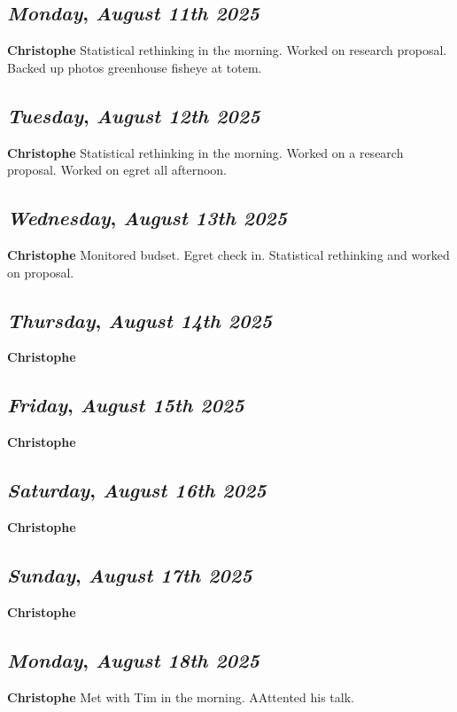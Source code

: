 \def\day{\textit{August 11th 2025}}
\def\weekday{\textit{Monday}}
\subsection*{\weekday, \day}
\textbf {Christophe}
Statistical rethinking in the morning. Worked on research proposal. Backed up photos greenhouse fisheye at totem.

\def\day{\textit{August 12th 2025}}
\def\weekday{\textit{Tuesday}}
\subsection*{\weekday, \day}
\textbf {Christophe}
Statistical rethinking in the morning. Worked on a research proposal. Worked on egret all afternoon. 

\def\day{\textit{August 13th 2025}}
\def\weekday{\textit{Wednesday}}
\subsection*{\weekday, \day}
\textbf {Christophe}
Monitored budset. Egret check in. Statistical rethinking and worked on proposal.

\def\day{\textit{August 14th 2025}}
\def\weekday{\textit{Thursday}}
\subsection*{\weekday, \day}
\textbf {Christophe}

\def\day{\textit{August 15th 2025}}
\def\weekday{\textit{Friday}}
\subsection*{\weekday, \day}
\textbf {Christophe}

\def\day{\textit{August 16th 2025}}
\def\weekday{\textit{Saturday}}
\subsection*{\weekday, \day}
\textbf {Christophe}

\def\day{\textit{August 17th 2025}}
\def\weekday{\textit{Sunday}}
\subsection*{\weekday, \day}
\textbf {Christophe}

\def\day{\textit{August 18th 2025}}
\def\weekday{\textit{Monday}}
\subsection*{\weekday, \day}
\textbf {Christophe}
Met with Tim in the morning. AAttented his talk. 

